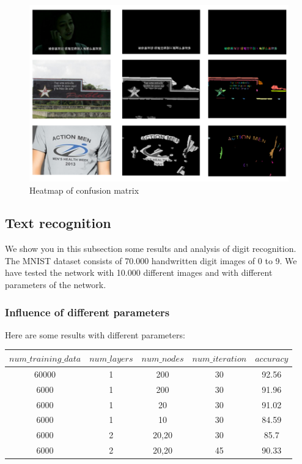 \documentclass[paper=a4, french, 11pt]{scrartcl}
\begin{document}
\begin{figure}[h]
\begin{center}
   \includegraphics[width=1.0\linewidth]{results.png}
\end{center}
\vspace{-3ex}
\caption{Heatmap of confusion matrix}
\label{fig:heatmap}
\end{figure}

\subsection{Text recognition} \mbox{} \vspace{-0.5cm}

We show you in this subsection some results and analysis of digit recognition. The MNIST dataset consists of 70.000 handwritten digit images of 0 to 9. We have tested the network with 10.000 different images and with different parameters of the network.

\subsubsection{Influence of different parameters} \mbox{} \vspace{-0.5cm}

Here are some results with different parameters:

\begin{small}
	\begin{tabular}{ |c|c|c|c|c| }
	\hline
	$num\_training\_data$ & $num\_layers$ & $num\_nodes$ & $num\_iteration$ & $accuracy$ \\
	\hline
	60000 & 1 & 200  & 30 & 92.56 \\
	\hline
	6000 & 1 & 200  & 30 & 91.96 \\
	\hline
	6000 & 1 & 20  & 30 & 91.02 \\
	\hline
	6000	 & 1 & 10  & 30 & 84.59 \\
	\hline
	6000 & 2 & 20,20  & 30 & 85.7\\
	\hline
	6000 & 2 & 20,20  & 45 & 90.33\\
	\hline
	\end{tabular}
\end{small}
\end{document}
